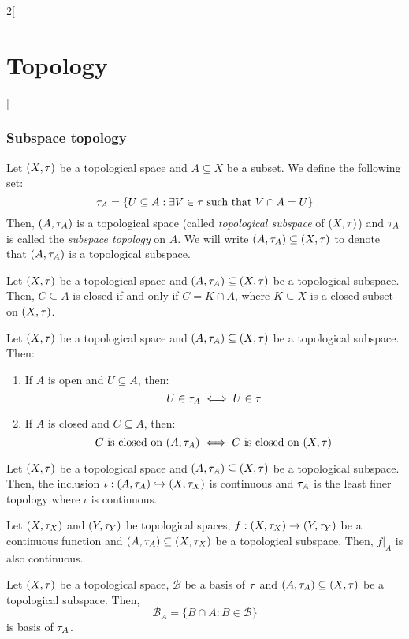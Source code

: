 \documentclass[../../../main.tex]{subfiles}
\begin{document}
\begin{multicols}{2}[\section{Topology}]
    \subsubsection{Subspace topology}
    \begin{definition}
        Let $(X,\tau)$ be a topological space and $A\subseteq X$ be a subset. We define the following set: $$\tau_A=\{U\subseteq A:\exists V\in\tau\text{ such that }V\cap A=U\}$$ Then, $(A,\tau_A)$ is a topological space (called \emph{topological subspace} of $(X,\tau)$) and $\tau_A$ is called the \emph{subspace topology} on $A$. We will write $(A,\tau_A)\subseteq (X,\tau)$ to denote that $(A,\tau_A)$ is a topological subspace.
    \end{definition}
    \begin{prop}
        Let $(X,\tau)$ be a topological space and $(A,\tau_A)\subseteq (X,\tau)$ be a topological subspace. Then, $C\subseteq A$ is closed if and only if $C=K\cap A$, where $K\subseteq X$ is a closed subset on $(X,\tau)$.
    \end{prop}
    \begin{prop}
        Let $(X,\tau)$ be a topological space and $(A,\tau_A)\subseteq (X,\tau)$ be a topological subspace. Then:
        \begin{enumerate}
            \item If $A$ is open and $U\subseteq A$, then: $$U\in\tau_A\iff U\in\tau$$
            \item If $A$ is closed and $C\subseteq A$, then: $$C\text{ is closed on }(A,\tau_A)\iff C\text{ is closed on }(X,\tau)$$
        \end{enumerate}
    \end{prop}
    \begin{prop}
        Let $(X,\tau)$ be a topological space and $(A,\tau_A)\subseteq (X,\tau)$ be a topological subspace. Then, the inclusion $\iota:(A,\tau_A)\hookrightarrow (X,\tau_X)$ is continuous and $\tau_A$ is the least finer topology where $\iota$ is continuous.
    \end{prop}
    \begin{corollary}
        Let $(X,\tau_X)$ and $(Y,\tau_Y)$ be topological spaces, $f:(X,\tau_X)\rightarrow (Y,\tau_Y)$ be a continuous function and $(A,\tau_A)\subseteq (X,\tau_X)$ be a topological subspace. Then, $f|_A$ is also continuous.
    \end{corollary}
    \begin{prop}
        Let $(X,\tau)$ be a topological space, $\mathcal{B}$ be a basis of $\tau$ and $(A,\tau_A)\subseteq (X,\tau)$ be a topological subspace. Then, $$\mathcal{B}_A=\{B\cap A:B\in\mathcal{B}\}$$ is basis of $\tau_A$.

\end{prop}
\end{multicols}
\end{document}
